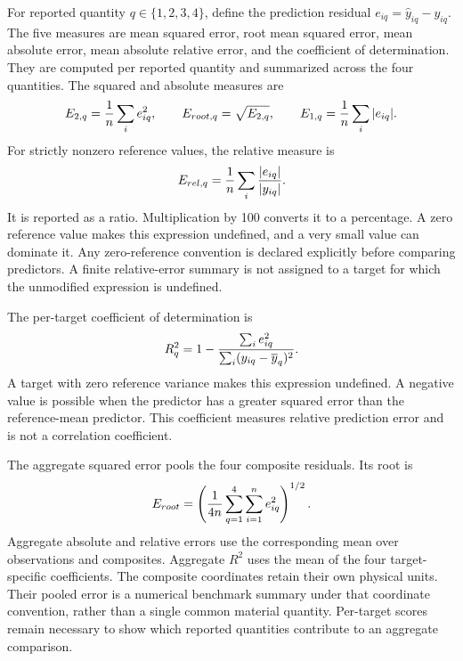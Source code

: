 For reported quantity \(q\in\{1,2,3,4\}\), define the prediction residual \(e_{iq}=\widehat y_{iq}-y_{iq}\). The five measures are mean squared error, root mean squared error, mean absolute error, mean absolute relative error, and the coefficient of determination. They are computed per reported quantity and summarized across the four quantities. The squared and absolute measures are
\begin{equation}
\equationname{Per-composite squared, root, and absolute error measures}
\label{eq:icsor_composite_error_metrics}
E_{2,q}=\frac{1}{n}\sum_i e_{iq}^{2},
\qquad E_{root,q}=\sqrt{E_{2,q}},
\qquad E_{1,q}=\frac{1}{n}\sum_i|e_{iq}|.
\end{equation}
For strictly nonzero reference values, the relative measure is
\begin{equation}
\equationname{Mean relative absolute error of a reported composite}
\label{eq:icsor_relative_error}
E_{rel,q}=\frac{1}{n}\sum_i\frac{|e_{iq}|}{|y_{iq}|}.
\end{equation}
It is reported as a ratio. Multiplication by 100 converts it to a percentage. A zero reference value makes this expression undefined, and a very small value can dominate it. Any zero-reference convention is declared explicitly before comparing predictors. A finite relative-error summary is not assigned to a target for which the unmodified expression is undefined.

The per-target coefficient of determination is
\begin{equation}
\equationname{Coefficient of determination for a reported composite}
\label{eq:icsor_coefficient_determination}
R_q^2=1-
\frac{\sum_i e_{iq}^{2}}
{\sum_i(y_{iq}-\overline y_q)^2}.
\end{equation}
A target with zero reference variance makes this expression undefined. A negative value is possible when the predictor has a greater squared error than the reference-mean predictor. This coefficient measures relative prediction error and is not a correlation coefficient.

The aggregate squared error pools the four composite residuals. Its root is
\begin{equation}
\equationname{Root mean squared error pooled across four reported composites}
\label{eq:icsor_aggregate_root_error}
E_{root}=\left(\frac{1}{4n}\sum_{q=1}^{4}\sum_{i=1}^{n}e_{iq}^{2}\right)^{1/2}.
\end{equation}
Aggregate absolute and relative errors use the corresponding mean over observations and composites. Aggregate \(R^2\) uses the mean of the four target-specific coefficients. The composite coordinates retain their own physical units. Their pooled error is a numerical benchmark summary under that coordinate convention, rather than a single common material quantity. Per-target scores remain necessary to show which reported quantities contribute to an aggregate comparison.

